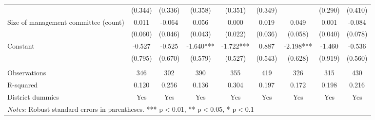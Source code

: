 \documentclass[11pt]{article}
\begin{document}
\begin{landscape}
\begin{table}[H]
{\begin{tabularx}{1.8\linewidth}{lcccccccc}
 & (0.344) & (0.336) & (0.358) & (0.351) & (0.349) &  & (0.290) & (0.410) \\
Size of management committee (count) & 0.011 & -0.064 & 0.056 & 0.000 & 0.019 & 0.049 & 0.001 & -0.084 \\
 & (0.060) & (0.046) & (0.043) & (0.022) & (0.036) & (0.058) & (0.040) & (0.078) \\
Constant & -0.527 & -0.525 & -1.640*** & -1.722*** & 0.887 & -2.198*** & -1.460 & -0.536 \\
 & (0.795) & (0.670) & (0.579) & (0.527) & (0.543) & (0.628) & (0.919) & (0.560) \\
 &  &  &  &  &  &  &  &  \\
Observations & 346 & 302 & 390 & 355 & 419 & 326 & 315 & 430 \\
R-squared & 0.120 & 0.256 & 0.136 & 0.304 & 0.197 & 0.172 & 0.198 & 0.216 \\
 District dummies & Yes & Yes & Yes & Yes & Yes & Yes & Yes & Yes \\ \hline
\multicolumn{9}{l}{\textit{Notes:} Robust standard errors in parentheses. *** p$<$0.01, ** p$<$0.05, * p$<$0.1} \\
  \end{tabularx}}
\end{table}
\doublespacing

\end{landscape}
\end{document}

